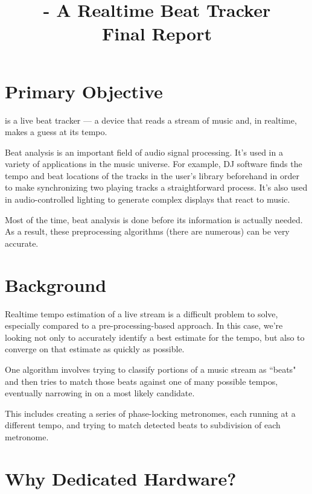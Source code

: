 \documentclass[letterpaper]{article}
\title{\projname{} - A Realtime Beat Tracker \\ Final Report}
\begin{document}
\maketitle

\section{Primary Objective}
    \projname is a live beat tracker --- a device that reads a stream of music
    and, in realtime, makes a guess at its tempo.  

    Beat analysis is an important field of audio signal processing.  It's used
    in a variety of applications in the music universe.  For example, DJ
    software finds the tempo and beat locations of the tracks in the user's
    library beforehand in order to make synchronizing two playing tracks a
    straightforward process.  It's also used in audio-controlled lighting to
    generate complex displays that react to music.

    Most of the time, beat analysis is done before its information is actually
    needed.  As a result, these preprocessing algorithms (there are numerous)
    can be very accurate.


\section{Background}

    Realtime tempo estimation of a live stream is a difficult problem to solve,
    especially compared to a pre-processing-based approach.  In this case,
    we're looking not only to accurately identify a best estimate for the
    tempo, but also to converge on that estimate as quickly as possible.

    One algorithm involves trying to classify portions of a music stream as
    ``beats" and then tries to match those beats against one of many possible
    tempos, eventually narrowing in on a most likely candidate.

    This includes creating a series of phase-locking metronomes, each running
    at a different tempo, and trying to match detected beats to subdivision of
    each metronome.


\section{Why Dedicated Hardware?}
\end{document}
